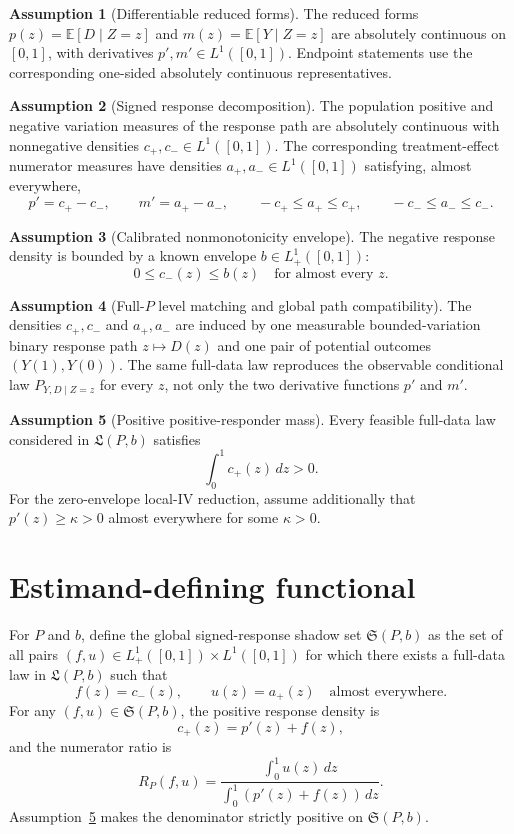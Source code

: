 \documentclass[11pt]{article}
\newcommand{\E}{\mathbb{E}}
\theoremstyle{definition}
\newtheorem{assumption}{Assumption}
\theoremstyle{plain}
\theoremstyle{remark}
\begin{document}
\begin{assumption}[Differentiable reduced forms]\label{ass:differentiable}
The reduced forms \(p(z)=\E[D\mid Z=z]\) and
\(m(z)=\E[Y\mid Z=z]\) are absolutely continuous on \([0,1]\), with
derivatives \(p',m'\in L^1([0,1])\).  Endpoint statements use the
corresponding one-sided absolutely continuous representatives.
\end{assumption}

\begin{assumption}[Signed response decomposition]\label{ass:signed-response}
The population positive and negative variation measures of the response path
are absolutely continuous with nonnegative densities
\(c_+,c_-\in L^1([0,1])\).  The corresponding treatment-effect numerator
measures have densities \(a_+,a_-\in L^1([0,1])\) satisfying, almost
everywhere,
\[
p'=c_+-c_-,
\qquad
m'=a_+-a_-,
\qquad
-c_+\le a_+\le c_+,
\qquad
-c_-\le a_-\le c_-.
\]
\end{assumption}

\begin{assumption}[Calibrated nonmonotonicity envelope]\label{ass:envelope}
The negative response density is bounded by a known envelope
\(b\in L^1_+([0,1])\):
\[
0\le c_-(z)\le b(z)
\quad\text{for almost every }z.
\]
\end{assumption}

\begin{assumption}[Full-\(P\) level matching and global path compatibility]\label{ass:path-compatible}
The densities \(c_+,c_-\) and \(a_+,a_-\) are induced by one measurable
bounded-variation binary response path \(z\mapsto D(z)\) and one pair of
potential outcomes \((Y(1),Y(0))\).  The same full-data law reproduces the
observable conditional law \(P_{Y,D\mid Z=z}\) for every \(z\), not only the
two derivative functions \(p'\) and \(m'\).
\end{assumption}

\begin{assumption}[Positive positive-responder mass]\label{ass:positive-mass}
Every feasible full-data law considered in \(\mathfrak L(P,b)\) satisfies
\[
\int_0^1 c_+(z)\,dz>0.
\]
For the zero-envelope local-IV reduction, assume additionally that
\(p'(z)\ge \kappa>0\) almost everywhere for some \(\kappa>0\).
\end{assumption}

\section{Estimand-defining functional}
For \(P\) and \(b\), define the global signed-response shadow set
\(\mathfrak S(P,b)\) as the set of all pairs \((f,u)\in L^1_+([0,1])\times
L^1([0,1])\) for which there exists a full-data law in \(\mathfrak L(P,b)\)
such that
\[
f(z)=c_-(z),
\qquad
u(z)=a_+(z)
\quad\text{almost everywhere.}
\]
For any \((f,u)\in\mathfrak S(P,b)\), the positive response density is
\[
c_+(z)=p'(z)+f(z),
\]
and the numerator ratio is
\[
R_P(f,u)=
\frac{\int_0^1 u(z)\,dz}
     {\int_0^1 (p'(z)+f(z))\,dz}.
\]
Assumption~\ref{ass:positive-mass} makes the denominator strictly positive on
\(\mathfrak S(P,b)\).
\end{document}
